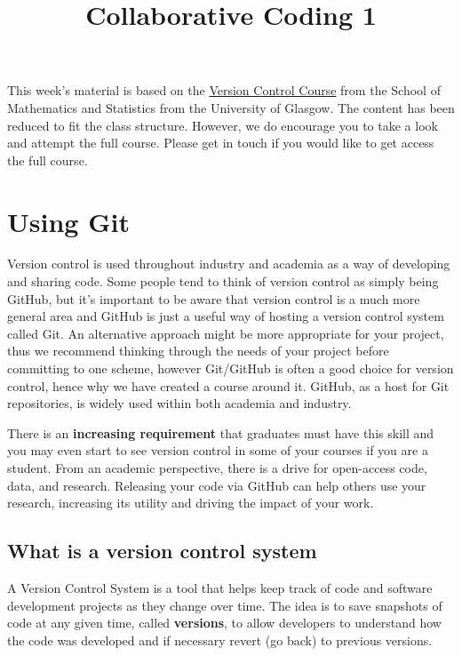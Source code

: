 \documentclass[
  letterpaper,
  DIV=11,
  numbers=noendperiod]{scrartcl}
\title{Collaborative Coding 1}
\author{}
\date{}
\makeatletter
\renewcommand{\maketitle}{\bgroup\setlength{\parindent}{0pt}
\begin{flushleft}
  {\color{uniblue}\sffamily\huge\textbf{\@title}} \vspace{0.3cm} \newline
  {\Large {\@subtitle}} \newline
  \@author
\end{flushleft}\egroup
}
\makeatother
\begin{document}
\maketitle

\pagestyle{mystyle}

This week's material is based on the
\href{https://moodle.gla.ac.uk/course/view.php?id=41115}{Version Control
Course} from the School of Mathematics and Statistics from the
University of Glasgow. The content has been reduced to fit the class
structure. However, we do encourage you to take a look and attempt the
full course. Please get in touch if you would like to get access the
full course.

\section{Using Git}\label{using-git}

Version control is used throughout industry and academia as a way of
developing and sharing code. Some people tend to think of version
control as simply being GitHub, but it's important to be aware that
version control is a much more general area and GitHub is just a useful
way of hosting a version control system called Git. An alternative
approach might be more appropriate for your project, thus we recommend
thinking through the needs of your project before committing to one
scheme, however Git/GitHub is often a good choice for version control,
hence why we have created a course around it. GitHub, as a host for Git
repositories, is widely used within both academia and industry.

There is an \textbf{increasing requirement} that graduates must have
this skill and you may even start to see version control in some of your
courses if you are a student. From an academic perspective, there is a
drive for open-access code, data, and research. Releasing your code via
GitHub can help others use your research, increasing its utility and
driving the impact of your work.

\subsection{What is a version control
system}\label{what-is-a-version-control-system}

A Version Control System is a tool that helps keep track of code and
software development projects as they change over time. The idea is to
save snapshots of code at any given time, called \textbf{versions}, to
allow developers to understand how the code was developed and if
necessary revert (go back) to previous versions.
\end{document}
